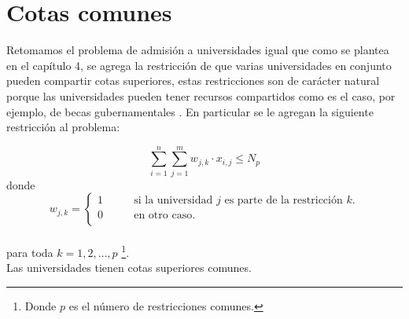 \chapter{Cotas comunes}

Retomamos el problema de admisión a universidades igual que como se plantea en el capítulo 4, se agrega la restricción de que varias universidades en conjunto pueden compartir cotas superiores, estas restricciones son de carácter natural porque las universidades pueden tener recursos compartidos como es el caso, por ejemplo, de becas gubernamentales . En particular se le agregan la siguiente restricción al problema:


\begin{equation}
\sum_{i=1}^{n} \sum_{j=1}^m w_{j,k} \cdot x_{i,j} \leq N_p %
\end{equation} 
donde \begin{equation} w_{j,k}= 
\begin{cases}
1 & \qquad \text{si la universidad $j$ es parte de la restricción $k$.} \\
0 &\qquad\text{en otro caso.} \\ 
\end{cases} \end{equation} \\ para toda $k=1,2,\dots,p$ \footnote{Donde $p$ es el número de restricciones comunes.}. \\
Las universidades tienen cotas superiores comunes.




